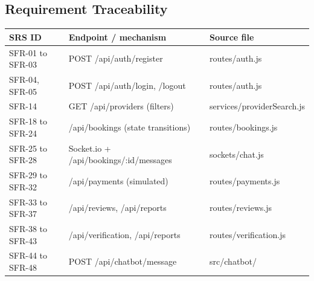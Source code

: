 \subsection{Requirement Traceability}
\begin{longtable}{p{3.2cm}p{5cm}p{5cm}}\toprule
\textbf{SRS ID} & \textbf{Endpoint / mechanism} & \textbf{Source file}\\\midrule\endhead
SFR-01 to SFR-03 & POST /api/auth/register & routes/auth.js\\
SFR-04, SFR-05   & POST /api/auth/login, /logout & routes/auth.js\\
SFR-14           & GET /api/providers (filters) & services/providerSearch.js\\
SFR-18 to SFR-24 & /api/bookings (state transitions) & routes/bookings.js\\
SFR-25 to SFR-28 & Socket.io + /api/bookings/:id/messages & sockets/chat.js\\
SFR-29 to SFR-32 & /api/payments (simulated) & routes/payments.js\\
SFR-33 to SFR-37 & /api/reviews, /api/reports & routes/reviews.js\\
SFR-38 to SFR-43 & /api/verification, /api/reports & routes/verification.js\\
SFR-44 to SFR-48 & POST /api/chatbot/message & src/chatbot/\\ \bottomrule
\end{longtable}
